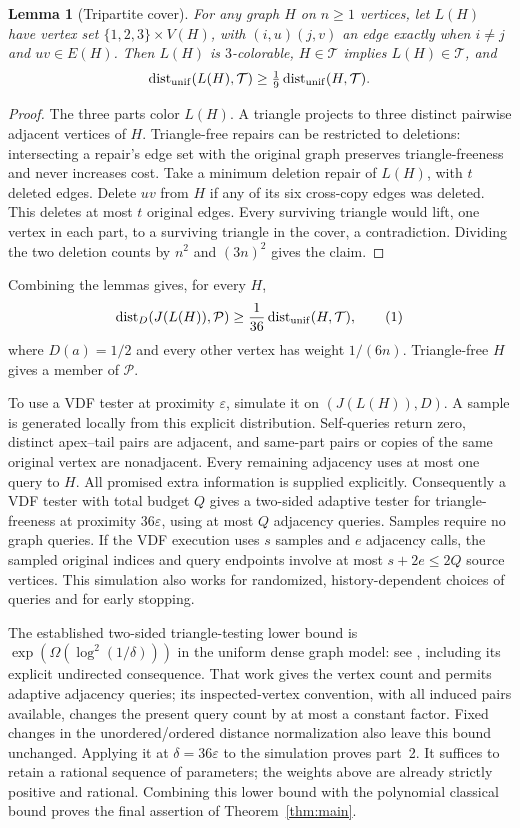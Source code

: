 \documentclass[11pt]{article}
\newtheorem{lemma}[theorem]{Lemma}
\newcommand{\dist}{\operatorname{dist}}
\newcommand{\TF}{\mathcal T}
\newcommand{\PP}{\mathcal P}
\newcommand{\eps}{\varepsilon}
\begin{document}
\begin{lemma}[Tripartite cover]\label{lem:cover}
For any graph $H$ on $n\ge1$ vertices, let $L(H)$ have vertex set
$\{1,2,3\}\times V(H)$, with $(i,u)(j,v)$ an edge exactly when
$i\ne j$ and $uv\in E(H)$. Then $L(H)$ is $3$-colorable,
$H\in\TF$ implies $L(H)\in\TF$, and
\[
              \dist_{\rm unif}(L(H),\TF)
                      \ge\tfrac19\dist_{\rm unif}(H,\TF).
\]
\end{lemma}
\begin{proof}
The three parts color $L(H)$. A triangle projects to three distinct
pairwise adjacent vertices of $H$. Triangle-free repairs can be
restricted to deletions: intersecting a repair's edge set with the
original graph preserves triangle-freeness and never increases cost.
Take a minimum deletion repair of $L(H)$, with $t$ deleted edges.
Delete $uv$ from $H$ if any of its six cross-copy edges was deleted.
This deletes at most $t$ original edges. Every surviving triangle
would lift, one vertex in each part, to a surviving triangle in the
cover, a contradiction. Dividing the two deletion counts by $n^2$
and $(3n)^2$ gives the claim.
\end{proof}

Combining the lemmas gives, for every $H$,
\[
 \dist_D(J(L(H)),\PP)\ge
                   \frac1{36}\dist_{\rm unif}(H,\TF),                 \tag{1}
\]
where $D(a)=1/2$ and every other vertex has weight $1/(6n)$.
Triangle-free $H$ gives a member of $\PP$.

To use a VDF tester at proximity $\eps$, simulate it on
$(J(L(H)),D)$. A sample is generated locally from this explicit
distribution. Self-queries return zero, distinct apex--tail pairs are adjacent, and
same-part pairs or copies of the same original vertex are nonadjacent.
Every remaining adjacency uses at most one query to $H$.
All promised extra information is supplied explicitly. Consequently
a VDF tester with total budget $Q$ gives a two-sided adaptive tester
for triangle-freeness at proximity $36\eps$, using at most $Q$
adjacency queries. Samples require no graph queries. If the VDF execution uses $s$ samples
and $e$ adjacency calls, the sampled original indices and query endpoints
involve at most $s+2e\le2Q$ source vertices. This simulation
also works for randomized, history-dependent choices of queries and
for early stopping.

The established two-sided triangle-testing lower bound is
$\exp(\Omega(\log^2(1/\delta)))$ in the uniform dense graph model:
see \cite[Theorem~4(ii) and \S7]{AS}, including its explicit
undirected consequence. That work gives the vertex count and permits
adaptive adjacency queries; its inspected-vertex convention, with all
induced pairs available, changes the present query count by at most a
constant factor. Fixed changes in the unordered/ordered distance
normalization also leave this bound unchanged. Applying it at
$\delta=36\eps$ to the simulation proves part~2. It suffices to retain
a rational sequence of parameters; the weights above are already
strictly positive and rational. Combining this lower bound with the
polynomial classical bound proves the final assertion of
Theorem~\ref{thm:main}.
\end{document}
